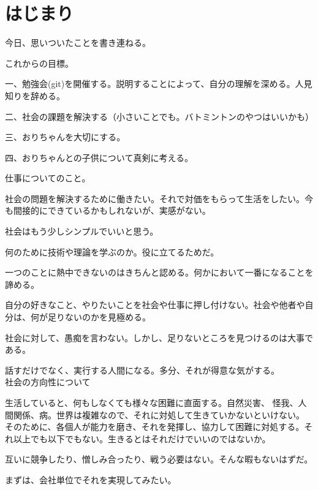 \chapter{はじまり}
今日、思いついたことを書き連ねる。

これからの目標。

一、勉強会(git)を開催する。説明することによって、自分の理解を深める。人見知りを辞める。

二、社会の課題を解決する（小さいことでも。バトミントンのやつはいいかも）

三、おりちゃんを大切にする。

四、おりちゃんとの子供について真剣に考える。



仕事についてのこと。

社会の問題を解決するために働きたい。それで対価をもらって生活をしたい。今も間接的にできているかもしれないが、実感がない。

社会はもう少しシンプルでいいと思う。

何のために技術や理論を学ぶのか。役に立てるためだ。

一つのことに熱中できないのはきちんと認める。何かにおいて一番になることを諦める。

自分の好きなこと、やりたいことを社会や仕事に押し付けない。社会や他者や自分は、何が足りないのかを見極める。

社会に対して、愚痴を言わない。しかし、足りないところを見つけるのは大事である。

話すだけでなく、実行する人間になる。多分、それが得意な気がする。
\\

社会の方向性について

生活していると、何もしなくても様々な困難に直面する。自然災害、
怪我、人間関係、病。世界は複雑なので、それに対処して生きていかないといけない。
そのために、各個人が能力を磨き、それを発揮し、協力して困難に対処する。それ以上でも以下でもない。生きるとはそれだけでいいのではないか。

互いに競争したり、憎しみ合ったり、戦う必要はない。そんな暇もないはずだ。

まずは、会社単位でそれを実現してみたい。

